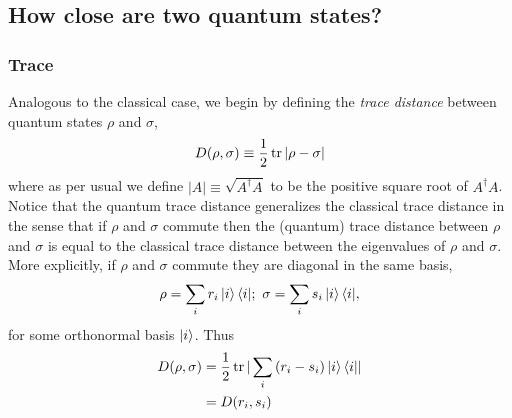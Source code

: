 \newpage
\subsection{How close are two quantum states?}

\subsubsection{Trace}
Analogous to the classical case, we begin by defining the \textit{trace distance} between quantum states $\rho$ and $\sigma$,
$$D(\rho, \sigma) \equiv \frac{1}{2}\tr|\rho - \sigma|$$
where as per usual we define $|A| \equiv \sqrt{A^\dag A}$ to be the positive square root of $A^\dag A$. Notice that the quantum trace distance generalizes the classical trace distance in the sense that if $\rho$ and $\sigma$ commute then the (quantum) trace distance between $\rho$ and $\sigma$ is equal to the classical trace distance between the eigenvalues of $\rho$ and $\sigma$. More explicitly, if $\rho$ and $\sigma$ commute they are diagonal in the same basis,
$$\rho = \sum_i{r_i\ket{i}\bra{i}};\ \sigma = \sum_i{s_i\ket{i}\bra{i}},$$
for some orthonormal basis $\ket{i}$. Thus
\begin{equation*}
\begin{split}
    D(\rho, \sigma) & = \frac{1}{2}\tr|\sum_i{(r_i - s_i)\ket{i}\bra{i}}|\\
    & = D(r_i, s_i)
\end{split}
\end{equation*}


